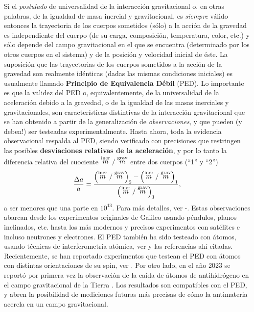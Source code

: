 Si el \textit{postulado} de universalidad de la interacción gravitacional o, en otras palabras, de la igualdad de masa inercial y gravitacional, es \textit{siempre} válido entonces la trayectoria de los cuerpos sometidos (sólo) a la acción de la gravedad es independiente del cuerpo (de su carga, composición, temperatura, color, etc.) y sólo depende del campo gravitacional en el que se encuentra (determinado por los otros cuerpos en el sistema) y de la posición y velocidad inicial de éste. La suposición que las trayectorias de los cuerpos sometidos a la acción de la gravedad son realmente idénticas (dadas las mismas condiciones iniciales) es usualmente llamado \textbf{Principio de Equivalencia Débil} (PED). Lo importante es que la validez del PED o, equivalentemente, de la universalidad de la aceleración debido a la gravedad, o de la igualdad de las masas inerciales y gravitacionales, son características distintivas de la interacción gravitacional que se han obtenido a partir de la generalización de \textit{observaciones}, y que pueden (y deben!) ser testeadas experimentalmente. Hasta ahora, toda la evidencia observacional respalda al PED, siendo verificado con precisiones que restringen las posibles \textbf{desviaciones relativas de la aceleración}, y por lo tanto la diferencia relativa del cuociente $\stackrel{\rm iner}{m}/\stackrel{\rm grav}{m}$ entre dos cuerpos (``1'' y ``2'')
\begin{equation}
\frac{\Delta a}{a}=\frac{\left(\stackrel{\rm iner}{m}/\stackrel{\rm grav}{m}\right)_2-\left(\stackrel{\rm iner}{m}/\stackrel{\rm grav}{m}\right)_1}{\left(\stackrel{\rm iner}{m}/\stackrel{\rm grav}{m}\right)_1},
\end{equation}
a ser menores que una parte en $10^{13}$. Para más detalles, ver \cite{Will06}-\cite{STEP}.
Estas observaciones abarcan desde los experimentos originales de Galileo usando péndulos, planos inclinados, etc. hasta los más modernos y precisos experimentos con satélites e incluso neutrones \cite{Koester76} y electrones. El PED también ha sido testeado con átomos, usando técnicas de interferometría atómica, ver \cite{Zhou15} y las referencias ahí citadas. Recientemente, se han reportado experimentos que testean el PED con átomos con distintas orientaciones de su spin, ver \cite{Duan16}. Por otro lado, en el año 2023 se reportó por primera vez la observación de la caída de átomos de antihidrógeno en el campo gravitacional de la Tierra \cite{A2023}. Los resultados son compatibles con el PED, y abren la posibilidad de mediciones futuras más precisas de cómo la antimateria acerela en un campo gravitacional.

